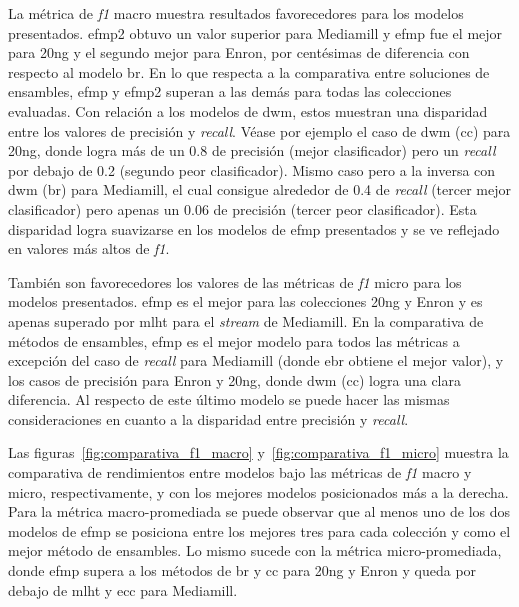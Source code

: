 La métrica de \textit{f1} macro muestra resultados favorecedores para los
modelos presentados. \acrshort{efmp2} obtuvo un valor superior para Mediamill y
\acrshort{efmp} fue el mejor para 20ng y el segundo mejor para Enron, por
centésimas de diferencia con respecto al modelo \acrshort{br}. En lo que
respecta a la comparativa entre soluciones de ensambles, \acrshort{efmp} y
\acrshort{efmp2} superan a las demás para todas las colecciones evaluadas.  Con
relación a los modelos de \acrshort{dwm}, estos muestran una disparidad entre
los valores de precisión y \textit{recall}. Véase por ejemplo el caso de
\acrshort{dwm} (\acrshort{cc}) para 20ng, donde logra más de un 0.8 de precisión
(mejor clasificador) pero un \textit{recall} por debajo de 0.2 (segundo peor
clasificador). Mismo caso pero a la inversa con \acrshort{dwm} (\acrshort{br})
para Mediamill, el cual consigue alrededor de 0.4 de \textit{recall} (tercer
mejor clasificador) pero apenas un 0.06 de precisión (tercer peor
clasificador).  Esta disparidad logra suavizarse en los modelos de
\acrshort{efmp} presentados y se ve reflejado en valores más altos de
\textit{f1}.

También son favorecedores los valores de las métricas de \textit{f1} micro para
los modelos presentados. \acrshort{efmp} es el mejor para las colecciones 20ng y
Enron y es apenas superado por \acrshort{mlht} para el \textit{stream} de
Mediamill. En la comparativa de métodos de ensambles, \acrshort{efmp} es el
mejor modelo para todos las métricas a excepción del caso de \textit{recall}
para Mediamill (donde \acrshort{ebr} obtiene el mejor valor), y los casos de
precisión para Enron y 20ng, donde \acrshort{dwm} (\acrshort{cc}) logra una
clara diferencia. Al respecto de este último modelo se puede hacer las mismas
consideraciones en cuanto a la disparidad entre precisión y \textit{recall}.

Las figuras~\ref{fig:comparativa_f1_macro} y~\ref{fig:comparativa_f1_micro}
muestra la comparativa de rendimientos entre modelos bajo las métricas de
\textit{f1} macro y micro, respectivamente, y con los mejores modelos
posicionados más a la derecha. Para la métrica macro-promediada se puede
observar que al menos uno de los dos modelos de \acrshort{efmp} se posiciona
entre los mejores tres para cada colección y como el mejor método de ensambles.
Lo mismo sucede con la métrica micro-promediada, donde \acrshort{efmp} supera a
los métodos de \acrshort{br} y \acrshort{cc} para 20ng y Enron y queda por
debajo de \acrshort{mlht} y \acrshort{ecc} para Mediamill.

